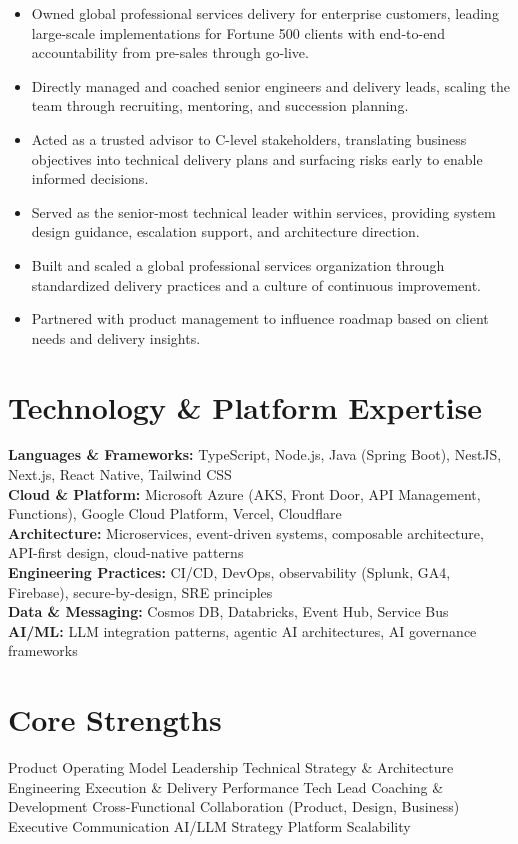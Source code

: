 \documentclass[11pt]{article}
\begin{document}
\begin{itemize}
  \item Owned global professional services delivery for enterprise customers, leading large-scale implementations for Fortune 500 clients with end-to-end accountability from pre-sales through go-live.
  \item Directly managed and coached senior engineers and delivery leads, scaling the team through recruiting, mentoring, and succession planning.
  \item Acted as a trusted advisor to C-level stakeholders, translating business objectives into technical delivery plans and surfacing risks early to enable informed decisions.
  \item Served as the senior-most technical leader within services, providing system design guidance, escalation support, and architecture direction.
  \item Built and scaled a global professional services organization through standardized delivery practices and a culture of continuous improvement.
  \item Partnered with product management to influence roadmap based on client needs and delivery insights.
\end{itemize}

\section*{Technology \& Platform Expertise}
\textbf{Languages \& Frameworks:} TypeScript, Node.js, Java (Spring Boot), NestJS, Next.js, React Native, Tailwind CSS \\
\textbf{Cloud \& Platform:} Microsoft Azure (AKS, Front Door, API Management, Functions), Google Cloud Platform, Vercel, Cloudflare \\
\textbf{Architecture:} Microservices, event-driven systems, composable architecture, API-first design, cloud-native patterns \\
\textbf{Engineering Practices:} CI/CD, DevOps, observability (Splunk, GA4, Firebase), secure-by-design, SRE principles \\
\textbf{Data \& Messaging:} Cosmos DB, Databricks, Event Hub, Service Bus \\
\textbf{AI/ML:} LLM integration patterns, agentic AI architectures, AI governance frameworks

\section*{Core Strengths}
Product Operating Model Leadership \textbullet{} Technical Strategy \& Architecture \textbullet{} Engineering Execution \& Delivery Performance \textbullet{} Tech Lead Coaching \& Development \textbullet{} Cross-Functional Collaboration (Product, Design, Business) \textbullet{} Executive Communication \textbullet{} AI/LLM Strategy \textbullet{} Platform Scalability
\end{document}
